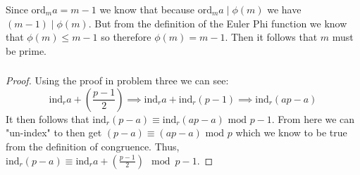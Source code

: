 \documentclass[class=article, crop=false]{standalone}
\def\ord{{\text{ord}}}
\def\ind{{\text{ind}}}
\begin{document}
\subsubsection{}
Since $\ord_m a = m-1$ we know that because $\ord_m a\mid \phi(m)$ we have $(m-1)\mid\phi(m)$.
  But from the definition of the Euler Phi function we know that $\phi(m) \leq m-1$ so therefore
  $\phi(m) = m-1$. Then it follows that $m$ must be prime.

\subsubsection{}
\begin{proof}
	Using the proof in problem three we can see:
	$$
		\ind_r a + \left(\frac{p-1}{2}\right) \implies
		\ind_r a + \ind_r(p-1) \implies
		\ind_r (ap - a)
	$$
	It then follows that
	$\ind_r(p-a) \equiv \ind_r(ap - a)\mbox{ mod } p-1$.
	From here we can "un-index" to then get
	$(p-a) \equiv (ap-a) \mbox{ mod }p$
	which we know to be true from the definition of congruence.
	Thus, $\ind_r(p-a)\equiv \ind_ra+\left(\frac{p-1}{2}\right)\mod p-1$.
\end{proof}
\end{document}
